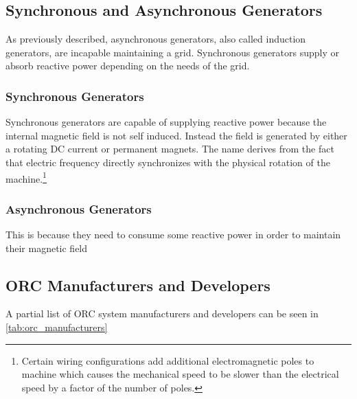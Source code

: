 
\subsection{Synchronous and Asynchronous Generators}
As previously described, asynchronous generators, also called induction generators, are incapable maintaining a grid. Synchronous generators supply or absorb reactive power depending on the needs of the grid.

\subsubsection{Synchronous Generators}
Synchronous generators are capable of supplying reactive power because the internal magnetic field is not self induced. Instead the field is generated by either a rotating DC current or permanent magnets. The name derives from the fact that electric frequency directly synchronizes with the physical rotation of the machine.\footnote{Certain wiring configurations add additional electromagnetic poles to machine which causes the mechanical speed to be slower than the electrical speed by a factor of the number of poles.} 

\subsubsection{Asynchronous Generators}
This is because they need to consume some reactive power in order to maintain their magnetic field 




\subsection{ORC Manufacturers and Developers}
A partial list of ORC system manufacturers and developers can be seen in \autoref{tab:orc_manufacturers}
 

